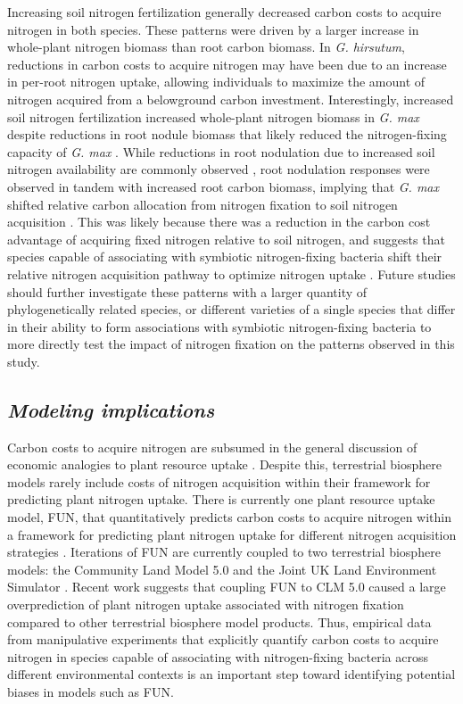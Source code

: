 Increasing soil nitrogen fertilization generally decreased carbon costs to acquire nitrogen in both species. These patterns were driven by a larger increase in whole-plant nitrogen biomass than root carbon biomass. In \textit{G. hirsutum}, reductions in carbon costs to acquire nitrogen may have been due to an increase in per-root nitrogen uptake, allowing individuals to maximize the amount of nitrogen acquired from a belowground carbon investment. Interestingly, increased soil nitrogen fertilization increased whole-plant nitrogen biomass in \textit{G. max} despite reductions in root nodule biomass that likely reduced the nitrogen-fixing capacity of \textit{G. max} . While reductions in root nodulation due to increased soil nitrogen availability are commonly observed , root nodulation responses were observed in tandem with increased root carbon biomass, implying that \textit{G. max} shifted relative carbon allocation from nitrogen fixation to soil nitrogen acquisition . This was likely because there was a reduction in the carbon cost advantage of acquiring fixed nitrogen relative to soil nitrogen, and suggests that species capable of associating with symbiotic nitrogen-fixing bacteria shift their relative nitrogen acquisition pathway to optimize nitrogen uptake . Future studies should further investigate these patterns with a larger quantity of phylogenetically related species, or different varieties of a single species that differ in their ability to form associations with symbiotic nitrogen-fixing bacteria to more directly test the impact of nitrogen fixation on the patterns observed in this study.

\subsection{\textit{Modeling implications}}
Carbon costs to acquire nitrogen are subsumed in the general discussion of economic analogies to plant resource uptake . Despite this, terrestrial biosphere models rarely include  costs of nitrogen acquisition within their framework for predicting plant nitrogen uptake. There is currently one plant resource uptake model, FUN, that quantitatively predicts carbon costs to acquire nitrogen within a framework for predicting plant nitrogen uptake for different nitrogen acquisition strategies . Iterations of FUN are currently coupled to two terrestrial biosphere models: the Community Land Model 5.0 and the Joint UK Land Environment Simulator . Recent work suggests that coupling FUN to CLM 5.0 caused a large overprediction of plant nitrogen uptake associated with nitrogen fixation  compared to other terrestrial biosphere model products. Thus, empirical data from manipulative experiments that explicitly quantify carbon costs to acquire nitrogen in species capable of associating with nitrogen-fixing bacteria across different environmental contexts is an important step toward identifying potential biases in models such as FUN.

